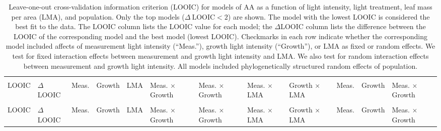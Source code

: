 \documentclass[
  letterpaper,
  DIV=11,
  numbers=noendperiod]{scrartcl}
\newcommand{\aax}{$\mathrm{AA}$}
\begin{document}
\begin{landscape}

\begin{longtable}[t]{>{\centering\arraybackslash}p{0.7in}>{\centering\arraybackslash}p{0.5in}>{\centering\arraybackslash}p{0.4in}>{\centering\arraybackslash}p{0.4in}>{\centering\arraybackslash}p{0.4in}>{\centering\arraybackslash}p{0.4in}>{\centering\arraybackslash}p{0.4in}>{\centering\arraybackslash}p{0.4in}>{\centering\arraybackslash}p{0.4in}>{\centering\arraybackslash}p{0.4in}>{\centering\arraybackslash}p{0.4in}>{\centering\arraybackslash}p{0.4in}}

\caption{\label{tbl-aa_loo2}Leave-one-out cross-validation information
criterion (LOOIC) for models of \aax{} as a function of light intensity,
light treatment, leaf mass per area (LMA), and population. Only the top
models (\(\Delta~\text{LOOIC} < 2\)) are shown. The model with the
lowest LOOIC is considered the best fit to the data. The LOOIC column
lists the LOOIC value for each model; the \(\Delta\)LOOIC column lists
the difference between the LOOIC of the corresponding model and the best
model (lowest LOOIC). Checkmarks in each row indicate whether the
corresponding model included affects of measurement light intensity
(``Meas.''), growth light intensity (``Growth''), or LMA as fixed or
random effects. We test for fixed interaction effects between
measurement and growth light intensity and LMA. We also test for random
interaction effects between measurement and growth light intensity. All
models included phylogenetically structured random effects of
population.}

\tabularnewline

\toprule
\multicolumn{2}{c}{ } & \multicolumn{7}{c}{Fixed} & \multicolumn{3}{c}{Random} \\
\cmidrule(l{3pt}r{3pt}){3-9} \cmidrule(l{3pt}r{3pt}){10-12}
LOOIC & $\Delta$LOOIC & Meas. & Growth & LMA & Meas. $\times$ Growth & Meas. $\times$ Growth & Meas. $\times$ LMA & Growth $\times$ LMA & Meas. & Growth & Meas. $\times$ Growth\\
\midrule
\endfirsthead
\multicolumn{12}{@{}l}{\textit{(continued)}}\\
\toprule
LOOIC & $\Delta$LOOIC & Meas. & Growth & LMA & Meas. $\times$ Growth & Meas. $\times$ Growth & Meas. $\times$ LMA & Growth $\times$ LMA & Meas. & Growth & Meas. $\times$ Growth\\
\midrule
\endhead


\end{longtable}
\end{landscape}
\end{document}
